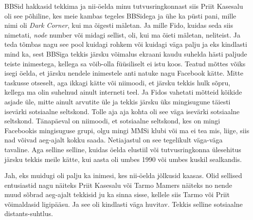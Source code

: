 
BBSid hakkasid tekkima ja nii-öelda minu tutvusringkonnast siis Priit 
Kasesalu oli see põhiline, kes meie kambas tegeles 
BBSidega ja ühe ka püsti pani, mille nimi oli \emph{Dark Corner}, kui ma õigesti mäletan. Ja mille Fido, kuidas seda siis nimetati, 
\emph{node} number või midagi sellist, oli, kui ma õieti mäletan, neliteist. Ja 
teda tõmbas nagu see pool kuidagi rohkem või kuidagi väga palju ja eks 
kindlasti mind ka, sest BBSiga tekkis järsku  võimalus  ekraani kaudu suhelda 
hästi paljude teiste inimestega, kellega sa võib-olla füüsiliselt ei istu koos. 
Teatud mõttes võiks isegi öelda, et järsku nendele inimestele anti natuke nagu 
Facebook kätte. Mitte taskusse otseselt, aga ikkagi kätte või niimoodi, et 
järsku tekkis hulk sõpru, kellega ma olin suhelnud ainult interneti teel. Ja 
Fidos vahetati mõtteid  kõikide asjade üle, mitte ainult arvutite üle ja tekkis 
järsku üks mingisugune  täiesti isevärki sotsiaalne seltskond. Tolle aja aja 
kohta oli see väga isevärki sotsiaalne seltskond. Tänapäeval on niimoodi, et 
sotsiaalne seltskond, kes on mingi Facebookis mingisuguse grupi, olgu mingi 
MMSi klubi või ma ei tea mis, liige,  siis nad võivad aeg-ajalt kokku saada. 
Netiajastul on see tegelikult väga-väga tavaline. Aga selline selline, kuidas 
öelda elustiil või tutvusringkonna ülesehitus järsku tekkis  meile kätte, kui  
aasta oli umbes 1990 või umbes kuskil sealkandis.


Jah, eks muidugi oli palju ka inimesi, kes nii-öelda jõlkusid kaasas. Olid 
sellised entusiastid nagu näiteks Priit Kasesalu 
või Tarmo Mamers näiteks no nende muud sõbrad  
aeg-ajalt tekkisid ju ka sinna sisse, kellele siis  Tarmo või Priit võimaldasid 
ligipääsu. Ja see oli kindlasti väga huvitav. Tekkis selline  sotsiaalne 
distants-suhtlus. 

